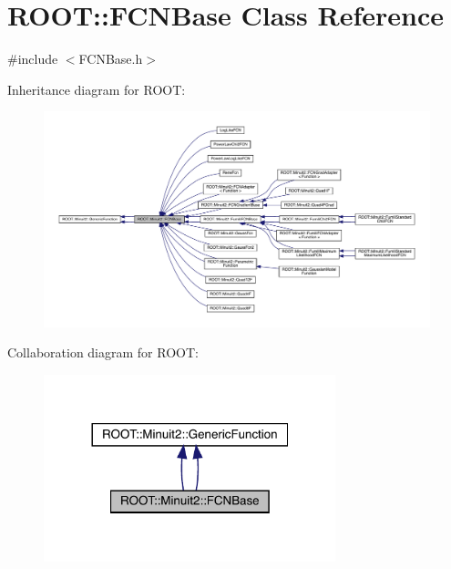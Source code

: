 \hypertarget{classROOT_1_1Minuit2_1_1FCNBase}{}\section{R\+O\+OT\+:\+:F\+C\+N\+Base Class Reference}
\label{classROOT_1_1Minuit2_1_1FCNBase}


{\ttfamily \#include $<$F\+C\+N\+Base.\+h$>$}



Inheritance diagram for R\+O\+OT\+:\nopagebreak
\begin{figure}[H]
\begin{center}
\leavevmode
\includegraphics[width=350pt]{d7/dcb/classROOT_1_1Minuit2_1_1FCNBase__inherit__graph}
\end{center}
\end{figure}


Collaboration diagram for R\+O\+OT\+:\nopagebreak
\begin{figure}[H]
\begin{center}
\leavevmode
\includegraphics[width=240pt]{d9/d0f/classROOT_1_1Minuit2_1_1FCNBase__coll__graph}
\end{center}
\end{figure}
